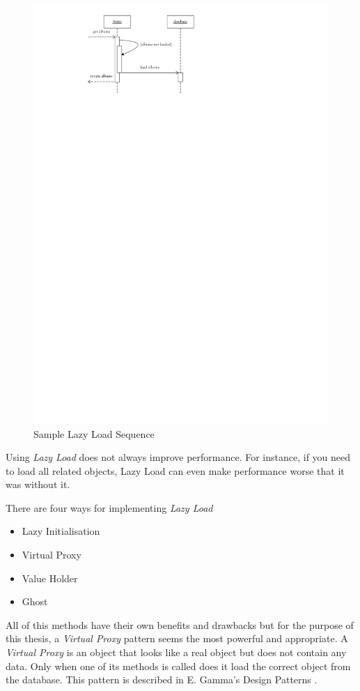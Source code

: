 			\begin{figure}[htb]
				\begin{center}
					\includegraphics{./files/inc/figures/patternsLazyLoad1}
					\caption{\label{fig:patternsLazyLoad1} Sample Lazy Load Sequence}
				\end{center}
			\end{figure}
			Using \textit{Lazy Load} does not always improve performance. For instance, if
			you need to load all related objects, Lazy Load can even make performance
			worse that it was without it.

			There are four ways for implementing \textit{Lazy Load}
			\begin{itemize}
				\item Lazy Initialisation
				\item Virtual Proxy
				\item Value Holder
				\item Ghost
			\end{itemize}
			All of this methods have their own benefits and drawbacks but for the purpose of
			this thesis, a \textit{Virtual Proxy} pattern seems the most powerful and appropriate. A \textit{Virtual
			Proxy} is an object that looks like a real object but does not contain any data. Only when
			one of its methods is called does it load the correct object from the database. This pattern is
			described in E. Gamma's Design Patterns \cite{Gamma97}.
			
